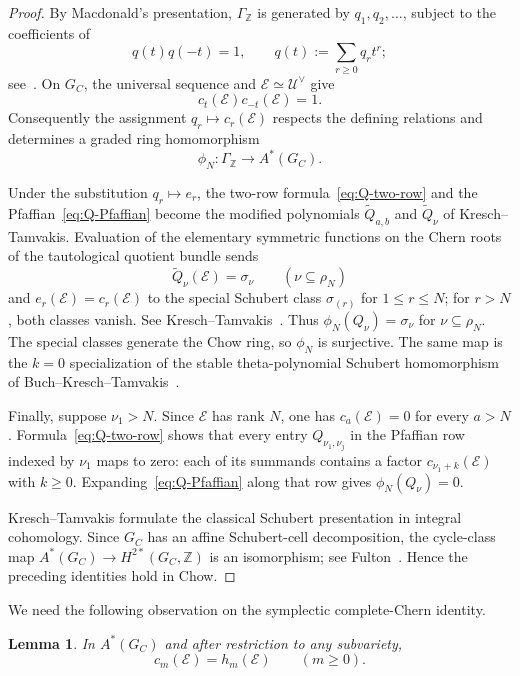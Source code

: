 \documentclass[11pt,a4paper,oneside]{amsart}
\numberwithin{equation}{section}
\newtheorem{lemma}[theorem]{Lemma}
\theoremstyle{definition}
\theoremstyle{remark}
\newcommand{\Z}{\mathbb Z}
\newcommand{\cE}{\mathcal E}
\newcommand{\cU}{\mathcal U}
\begin{document}
\begin{proof}
By Macdonald's presentation, $\Gamma_{\Z}$ is generated by $q_1,q_2,\ldots$, subject to the coefficients of
\begin{equation}\label{eq:q-relations}
 q(t)q(-t)=1,
 \qquad q(t):=\sum_{r\geq0}q_rt^r;
\end{equation}
see~\cite[Chapter~III, equations~(8.2)--(8.5)]{Macdonald}.  On $G_C$, the universal sequence and $\cE\simeq\cU^\vee$ give
\[
 c_t(\cE)c_{-t}(\cE)=1.
\]
Consequently the assignment $q_r\mapsto c_r(\cE)$ respects the defining relations and determines a graded ring homomorphism
\[
 \phi_N:\Gamma_{\Z}\longrightarrow A^*(G_C).
\]

Under the substitution $q_r\mapsto e_r$, the two-row formula~\eqref{eq:Q-two-row} and the Pfaffian~\eqref{eq:Q-Pfaffian} become the modified polynomials $\widetilde Q_{a,b}$ and $\widetilde Q_\nu$ of Kresch--Tamvakis.  Evaluation of the elementary symmetric functions on the Chern roots of the tautological quotient bundle sends
\[
 \widetilde Q_\nu(\cE)=\sigma_\nu
 \qquad(\nu\subseteq\rho_N)
\]
and $e_r(\cE)=c_r(\cE)$ to the special Schubert class $\sigma_{(r)}$ for $1\leq r\leq N$; for $r>N$, both classes vanish.  See Kresch--Tamvakis~\cite[Section~2, equations~(1)--(2), and the paragraph preceding Theorem~1]{KT03}.  Thus $\phi_N(Q_\nu)=\sigma_\nu$ for $\nu\subseteq\rho_N$.  The special classes generate the Chow ring, so $\phi_N$ is surjective.  The same map is the $k=0$ specialization of the stable theta-polynomial Schubert homomorphism of Buch--Kresch--Tamvakis~\cite[Theorem~2]{BKT17}.

Finally, suppose $\nu_1>N$.  Since $\cE$ has rank $N$, one has $c_a(\cE)=0$ for every $a>N$.  Formula~\eqref{eq:Q-two-row} shows that every entry $Q_{\nu_1,\nu_j}$ in the Pfaffian row indexed by $\nu_1$ maps to zero: each of its summands contains a factor $c_{\nu_1+k}(\cE)$ with $k\geq0$.  Expanding~\eqref{eq:Q-Pfaffian} along that row gives $\phi_N(Q_\nu)=0$.

Kresch--Tamvakis formulate the classical Schubert presentation in integral cohomology.  Since $G_C$ has an affine Schubert-cell decomposition, the cycle-class map $A^*(G_C)\to H^{2*}(G_C,\Z)$ is an isomorphism; see Fulton~\cite[Example~19.1.11]{FultonIT}.  Hence the preceding identities hold in Chow.
\end{proof}

We need the following observation on the symplectic complete-Chern identity.

\begin{lemma}\label{lem:c-equals-h}
In $A^*(G_C)$ and after restriction to any subvariety,
\begin{equation}\label{eq:c-equals-h}
 c_m(\cE)=h_m(\cE)\qquad(m\geq0).
\end{equation}
\end{lemma}
\end{document}
